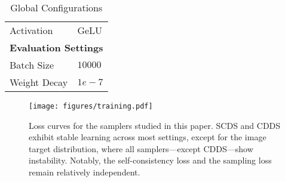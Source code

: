 \begin{table*}
\begin{minipage}[t]{.45\textwidth}
\begin{tabular}{p{4cm} p{4cm}}
            Activation & GeLU \\
            \multicolumn{2}{c}{\textbf{Evaluation Settings}} \\
            \midrule
            Batch Size & $10000$ \\
            Weight Decay & $1e-7$ \\ 
            \bottomrule
        \end{tabular}
        \caption{Global Configurations}
        \label{tab:details}
    \end{minipage}
\end{table*}


\begin{figure}[tb!]
\centering
\texttt{[image: figures/training.pdf]}
\caption{Loss curves for the samplers studied in this paper. 
SCDS and CDDS exhibit stable learning across most settings, except for the image target distribution, where all samplers—except CDDS—show instability. 
Notably, the self-consistency loss and the sampling loss remain relatively independent.}
\label{fig:training}
\end{figure}